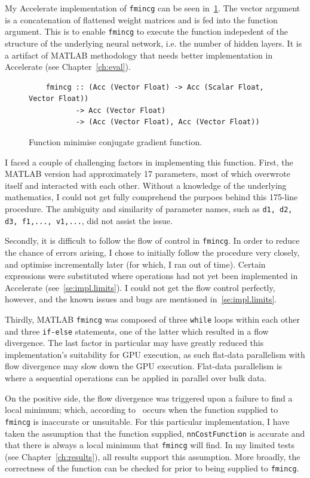 My Accelerate implementation of \texttt{fmincg} can be seen in~\ref{fig:fmincg}. The vector argument is a concatenation of flattened weight matrices and is fed into the function argument. This is to enable \texttt{fmincg} to execute the function indepedent of the structure of the underlying neural network, i.e. the number of hidden layers. It is a artifact of MATLAB methodology that needs better implementation in Accelerate (see Chapter~\ref{ch:eval}).

\begin{figure}
	\begin{lstlisting}
	fmincg :: (Acc (Vector Float) -> Acc (Scalar Float, Vector Float))
           -> Acc (Vector Float)
           -> (Acc (Vector Float), Acc (Vector Float))
	\end{lstlisting}
  	\caption{Function minimise conjugate gradient function.}
	\label{fig:fmincg}
\end{figure}

I faced a couple of challenging factors in implementing this function. First, the MATLAB version had approximately 17 parameters, most of which overwrote itself and interacted with each other. Without a knowledge of the underlying mathematics, I could not get fully comprehend the purpoes behind this 175-line procedure. The ambiguity and similarity of parameter names, such as \texttt{d1, d2, d3, f1,..., v1,...}, did not assist the issue. 

Secondly, it is difficult to follow the flow of control in \texttt{fmincg}. In order to reduce the chance of errors arising, I chose to initially follow the procedure very closely, and optimise incrementally later (for which, I ran out of time). Certain expressions were substituted where operations had not yet been implemented in Accelerate (see~\ref{se:impl.limits}). I could not get the flow control perfectly, however, and the known issues and bugs are mentioned in~\ref{se:impl.limits}.

Thirdly, MATLAB \texttt{fmincg} was composed of three \texttt{while} loops within each other and three \texttt{if-else} statements, one of the latter which resulted in a flow divergence. The last factor in particular may have greatly reduced this implementation's suitability for GPU execution, as such flat-data parallelism with flow divergence may slow down the GPU execution. Flat-data parallelism is where a sequential operations can be applied in parallel over bulk data.

On the positive side, the flow divergence was triggered upon a failure to find a local minimum; which, according to~\cite{Reb13} occurs when the function supplied to \texttt{fmincg} is inaccurate or unsuitable. For this particular implementation, I have taken the assumption that the function supplied, \texttt{nnCostFunction} is accurate and that there is always a local minimum that \texttt{fmincg} will find. In my limited tests (see Chapter~\ref{ch:results}), all results support this assumption. More broadly, the correctness of the function can be checked for prior to being supplied to \texttt{fmincg}.

